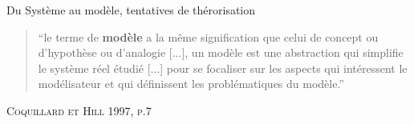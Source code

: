 \documentclass[newPxFont]{beamer}
\begin{document}

\begin{frame}[c]{Du Système au modèle, tentatives de thérorisation}
\vspace{-1em}
\begin{quote}
  \enquote{le terme de \textbf{modèle} a la même signification que celui de concept ou d'hypothèse ou d'analogie [...], un modèle est une abstraction qui simplifie le système réel étudié [...] pour se focaliser sur les aspects qui intéressent le modélisateur et qui définissent les problématiques du modèle.}
\end{quote}

\hspace*{\fill}\textsc{Coquillard et Hill 1997, p.7}
\vspace{-0.5em}
\begin{figure}
 	\centering
 		 \hspace{0.2em} %
     \hspace{0.2em} %
 		 \hspace{0.2em} %
\end{figure}
\end{frame}
\end{document}
